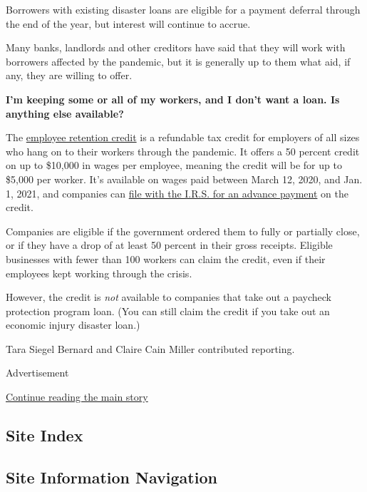 Borrowers with existing disaster loans are eligible for a payment
deferral through the end of the year, but interest will continue to
accrue.

Many banks, landlords and other creditors have said that they will work
with borrowers affected by the pandemic, but it is generally up to them
what aid, if any, they are willing to offer.

\textbf{I'm keeping some or all of my workers, and I don't want a loan.
Is anything else available?}

The
\href{https://www.irs.gov/newsroom/irs-employee-retention-credit-available-for-many-businesses-financially-impacted-by-covid-19}{employee
retention credit} is a refundable tax credit for employers of all sizes
who hang on to their workers through the pandemic. It offers a 50
percent credit on up to \$10,000 in wages per employee, meaning the
credit will be for up to \$5,000 per worker. It's available on wages
paid between March 12, 2020, and Jan. 1, 2021, and companies can
\href{https://www.irs.gov/forms-pubs/about-form-7200}{file with the
I.R.S. for an advance payment} on the credit.

Companies are eligible if the government ordered them to fully or
partially close, or if they have a drop of at least 50 percent in their
gross receipts. Eligible businesses with fewer than 100 workers can
claim the credit, even if their employees kept working through the
crisis.

However, the credit is \emph{not} available to companies that take out a
paycheck protection program loan. (You can still claim the credit if you
take out an economic injury disaster loan.)

Tara Siegel Bernard and Claire Cain Miller contributed reporting.

Advertisement

\protect\hyperlink{after-bottom}{Continue reading the main story}

\hypertarget{site-index}{%
\subsection{Site Index}\label{site-index}}

\hypertarget{site-information-navigation}{%
\subsection{Site Information
Navigation}\label{site-information-navigation}}

